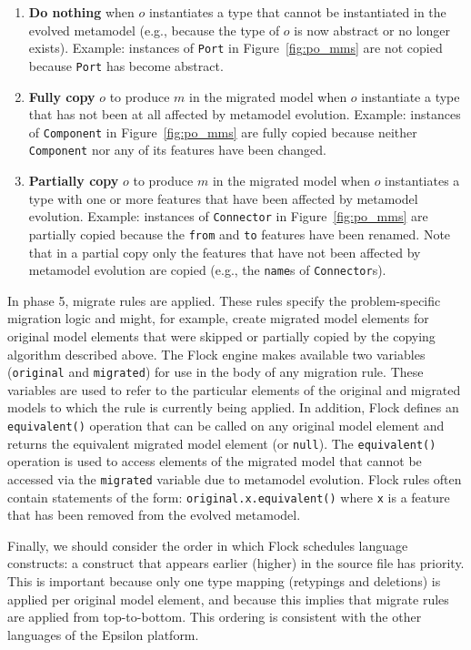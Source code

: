 \begin{enumerate}
	\item \textbf{Do nothing} when $o$ instantiates a type that cannot be instantiated in the evolved metamodel (e.g., because the type of $o$ is now abstract or no longer exists). Example: instances of \texttt{Port} in Figure~\ref{fig:po_mms} are not copied because \texttt{Port} has become abstract.
	\item \textbf{Fully copy} $o$ to produce $m$ in the migrated model when $o$ instantiate a type that has not been at all affected by metamodel evolution. Example: instances of \texttt{Component} in Figure~\ref{fig:po_mms} are fully copied because neither \texttt{Component} nor any of its features have been changed.
	\item \textbf{Partially copy} $o$ to produce $m$ in the migrated model when $o$ instantiates a type with one or more features that have been affected by metamodel evolution. Example: instances of \texttt{Connector} in Figure~\ref{fig:po_mms} are partially copied because the \texttt{from} and \texttt{to} features have been renamed. Note that in a partial copy only the features that have not been affected by metamodel evolution are copied (e.g., the \texttt{name}s of \texttt{Connector}s).
\end{enumerate}

In phase 5, migrate rules are applied. These rules specify the problem-specific migration logic and might, for example, create migrated model elements for original model elements that were skipped or partially copied by the copying algorithm described above. The Flock engine makes available two variables (\texttt{or\-ig\-in\-al} and \texttt{mi\-gr\-at\-ed}) for use in the body of any migration rule. These variables are used to refer to the particular elements of the original and migrated models to which the rule is currently being applied. In addition, Flock defines an \texttt{equivalent()} operation that can be called on any original model element and returns the equivalent migrated model element (or \texttt{null}). The \texttt{equivalent()} operation is used to access elements of the migrated model that cannot be accessed via the \texttt{migrated} variable due to metamodel evolution. Flock rules often contain statements of the form: \texttt{original.x.equivalent()} where \texttt{x} is a feature that has been removed from the evolved metamodel.

Finally, we should consider the order in which Flock schedules language constructs: a construct that appears earlier (higher) in the source file has priority. This is important because only one type mapping (retypings and deletions) is applied per original model element, and because this implies that migrate rules are applied from top-to-bottom. This ordering is consistent with the other languages of the Epsilon platform.

